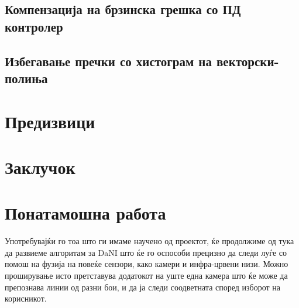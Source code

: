 \documentclass{article}
\begin{document}
\subsection{Компензација на брзинска грешка со ПД контролер}
\subsection{Избегавање пречки со хистограм на векторски-полиња}
\section{Предизвици}
\section{Заклучок}
\section{Понатамошна работа}
Употребувајќи го тоа што ги имаме научено од проектот, ќе продолжиме од тука да развиеме алгоритам за DaNI што ќе го оспособи прецизно да следи луѓе со помош на фузија на повеќе сензори, како камери и инфра-црвени низи. Можно проширување исто претставува додатокот на уште една камера што ќе може да препознава линии од разни бои, и да ја следи соодветната според изборот на корисникот.
\end{document}
